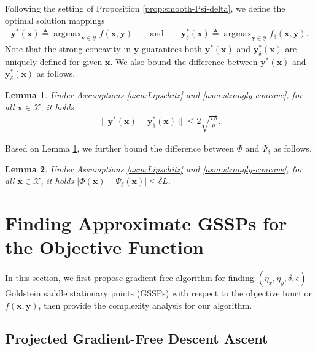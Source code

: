 \documentclass[11pt]{article}
\def\vx{\mathbf{x}}
\def\vy{\mathbf{y}}
\def\fX{{\mathcal{X}}}
\def\fY{{\mathcal{Y}}}
\DeclareMathOperator*{\argmax}{argmax}
\newtheorem{lemma}{Lemma}
\begin{document}
Following the setting of Proposition \ref{prop:smooth-Psi-delta},
we define the optimal solution mappings 
\begin{align}\label{eq:y-star}
    \vy^*(\vx) \triangleq \argmax_{\vy\in\fY} f(\vx,\vy)
    \qquad\text{and}\qquad
    \vy_\delta^*(\vx) \triangleq \argmax_{\vy\in\fY} f_\delta(\vx,\vy).
\end{align}
Note that the strong concavity in $\vy$ guarantees both $\vy^*(\vx)$ and $\vy_\delta^*(\vx)$ are uniquely defined for given $\vx$.
We also bound the difference between  $\vy^*(\vx)$ and $\vy_\delta^*(\vx)$ as follows.
\begin{lemma}\label{distance between y_star and y_star_delta}
    Under Assumptions \ref{asm:Lipschitz} and \ref{asm:strongly-concave}, for all $\vx\in\fX$, it holds
    \begin{align*}
        \|\vy^*(\vx)-\vy_\delta^*(\vx)\|\leq 2\sqrt{\frac{L\delta}{\mu}}.    
    \end{align*}
\end{lemma}
Based on Lemma \ref{distance between y_star and y_star_delta},
we further bound the difference between $\Phi$ and $\Psi_\delta$ as follows.
\begin{lemma}\label{distance between Phi Phi_delta}
Under Assumptions \ref{asm:Lipschitz} and \ref{asm:strongly-concave}, 
for all $\vx\in\fX$, it holds 
$|\Phi(\vx)-\Psi_\delta(\vx)|\leq \delta L$.
\end{lemma}




\section{Finding Approximate GSSPs for the Objective Function}\label{sec: f}

In this section, we first propose gradient-free algorithm for finding $(\eta_x,\eta_y,\delta, \epsilon)$-Goldstein saddle stationary points (GSSPs) with respect to the objective function $f(\vx,\vy)$, then provide the complexity analysis for our algorithm. 

\subsection{Projected Gradient-Free Descent Ascent}
\end{document}

